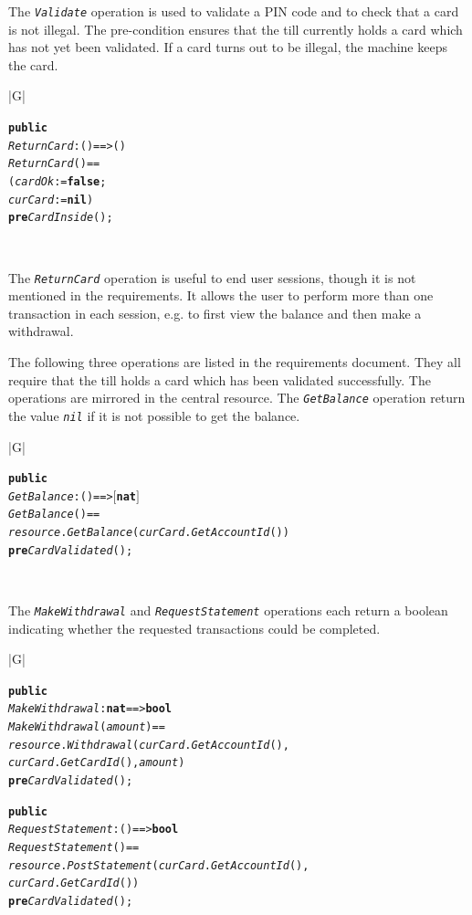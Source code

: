 \documentclass[\pformat,12pt,twoside]{article}
\newenvironment{VDMgray}%
{\begin{tabular}{|G|}\hline\small\begin{alltt}}%
{\end{alltt}\normalsize\\
 \hline\end{tabular}}
\begin{document}
The \texttt{\emph{Validate}} operation is used to validate a PIN code and to 
check that a card is not illegal. The pre-condition ensures that 
the till currently holds a card which has not yet been validated. 
If a card turns out to be illegal, the machine keeps the card. 


\begin{VDMgray}
 \textbf{public}
 \textit{ReturnCard} : () ==\texttt{>} ()
 \textit{ReturnCard}() ==
   (\textit{cardOk} := \textbf{false};
    \textit{curCard}:= \textbf{nil})
 \textbf{pre} \textit{CardInside}();
\end{VDMgray}


The \texttt{\emph{ReturnCard}} operation is useful to end user sessions, though 
it is not mentioned in the requirements. It allows the user to 
perform more than one transaction in each session, e.g. to first 
view the balance and then make a withdrawal.

The following three operations are listed in the requirements 
document. They all require that the till holds a card which has 
been validated successfully. The operations are mirrored in the 
central resource. The \texttt{\emph{GetBalance}} operation return the value \texttt{\emph{nil}} 
if it is not possible to get the balance. 

\begin{VDMgray}
 \textbf{public}
 \textit{GetBalance} : () ==\texttt{>} \ensuremath{[}\textbf{nat}\ensuremath{]}
 \textit{GetBalance}() ==
   \textit{resource}.\textit{GetBalance}(\textit{curCard}.\textit{GetAccountId}())
 \textbf{pre} \textit{CardValidated}();
\end{VDMgray}


The \texttt{\emph{MakeWithdrawal}} and \texttt{\emph{RequestStatement}} operations each return 
a boolean indicating whether the requested transactions could 
be completed.

\begin{VDMgray}
 \textbf{public}
 \textit{MakeWithdrawal} : \textbf{nat} ==\texttt{>} \textbf{bool}
 \textit{MakeWithdrawal}(\textit{amount}) ==
   \textit{resource}.\textit{Withdrawal}(\textit{curCard}.\textit{GetAccountId}(),
                       \textit{curCard}.\textit{GetCardId}(),\textit{amount})
 \textbf{pre} \textit{CardValidated}();

 \textbf{public}
 \textit{RequestStatement} : () ==\texttt{>} \textbf{bool}
 \textit{RequestStatement}() ==
   \textit{resource}.\textit{PostStatement}(\textit{curCard}.\textit{GetAccountId}(),
                          \textit{curCard}.\textit{GetCardId}())
 \textbf{pre} \textit{CardValidated}();
\end{VDMgray}
\end{document}

